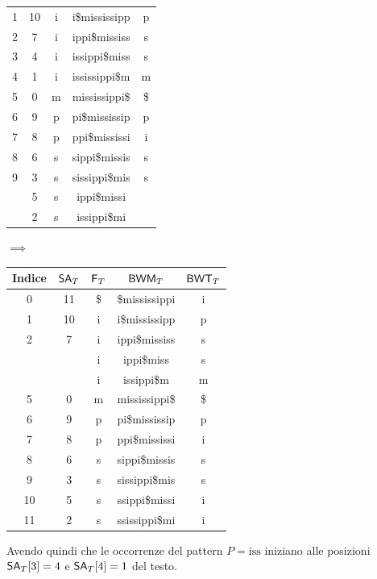 \begin{esempio}
\begin{table}[H]
\begin{tabular}{c|c|c|c|c}
      1 & 10 & i & i\$mississipp & p\\
      2 & 7 & i & ippi\$mississ & s\\
      3 & 4 & i & issippi\$miss & s\\
      4 & 1 & i & ississippi\$m & m\\
      5 & 0 & m & mississippi\$ & \$\\
      6 & 9 & p & pi\$mississip & p\\
      7 & 8 & p & ppi\$mississi & i\\
      8 & 6 & s & sippi\$missis & s\\
      9 & 3 & s & sissippi\$mis & s\\
      {\color{nordred}{10}} & 5 & s & {\color{nordred}{ss}}ippi\$missi
      & {\color{nordgreen}{i}}\\
      {\color{nordred}{11}} & 2 & s & {\color{nordred}{ss}}issippi\$mi
      & {\color{nordgreen}{i}}\\
    \end{tabular}
    $\implies$
    \begin{tabular}{c|c|c|c|c} 
      \textbf{Indice} & $\mbox{\rm {\sf SA}}_T$ & $\mbox{\rm {\sf F}}_T$ & $\mbox{\rm {\sf BWM}}_T$
      & $\mbox{\rm {\sf BWT}}_T$\\ 
      \hline
      0 & 11 & \$ & \$mississippi & i\\
      1 & 10 & i & i\$mississipp & p\\
      2 & 7 & i & ippi\$mississ & s\\
      {\color{nordred}{3}} & {\color{nordgreen}{\underline{4}}} & i
                                        & {\color{nordred}{iss}}ippi\$miss & s\\
      {\color{nordred}{4}} & {\color{nordgreen}{\underline{1}}} & i
                                        & {\color{nordred}{iss}}issippi\$m & m\\
      5 & 0 & m & mississippi\$ & \$\\
      6 & 9 & p & pi\$mississip & p\\
      7 & 8 & p & ppi\$mississi & i\\
      8 & 6 & s & sippi\$missis & s\\
      9 & 3 & s & sissippi\$mis & s\\
      10 & 5 & s & ssippi\$missi & i\\
      11 & 2 & s & ssissippi\$mi & i\\
    \end{tabular}
  \end{table}
  Avendo quindi che le occorrenze del pattern $P=\mbox{iss}$ iniziano alle
  posizioni $\mbox{\rm {\sf SA}}_T[3]=4$ e $\mbox{\rm {\sf SA}}_T[4]=1$ del testo.
\end{esempio}
